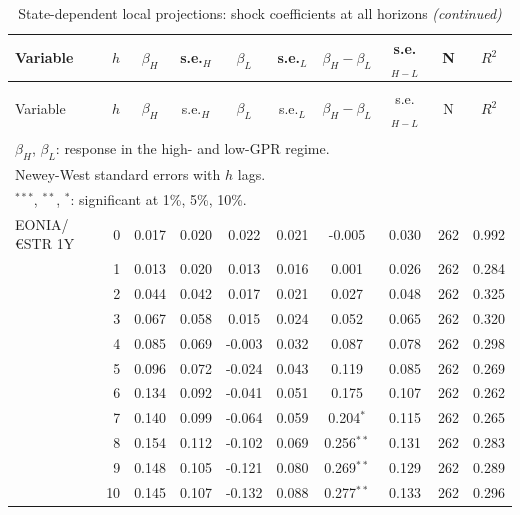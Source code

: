 \begingroup\fontsize{8}{10}\selectfont

\begin{longtable}[t]{lrcccccccc}
\caption{\label{tab:stlp_all_horizons}State-dependent local projections: shock coefficients at all horizons}\\
\toprule
Variable & $h$ & $\beta_H$ & s.e.$_H$ & $\beta_L$ & s.e.$_L$ & $\beta_H-\beta_L$ & s.e.$_{H-L}$ & N & $R^2$\\
\midrule
\endfirsthead
\caption[]{State-dependent local projections: shock coefficients at all horizons \textit{(continued)}}\\
\toprule
Variable & $h$ & $\beta_H$ & s.e.$_H$ & $\beta_L$ & s.e.$_L$ & $\beta_H-\beta_L$ & s.e.$_{H-L}$ & N & $R^2$\\
\midrule
\endhead

\endfoot
\bottomrule
\multicolumn{10}{l}{\rule{0pt}{1em}\textit{Notes:}}\\
\multicolumn{10}{l}{\rule{0pt}{1em}$\beta_H$, $\beta_L$: response in the high- and low-GPR regime.}\\
\multicolumn{10}{l}{\rule{0pt}{1em}Newey-West standard errors with $h$ lags.}\\
\multicolumn{10}{l}{\rule{0pt}{1em}$^{***}$, $^{**}$, $^{*}$: significant at 1\%, 5\%, 10\%.}\\
\endlastfoot
EONIA/€STR 1Y & 0 & 0.017 & 0.020 & 0.022 & 0.021 & -0.005 & 0.030 & 262 & 0.992\\
 & 1 & 0.013 & 0.020 & 0.013 & 0.016 & 0.001 & 0.026 & 262 & 0.284\\
 & 2 & 0.044 & 0.042 & 0.017 & 0.021 & 0.027 & 0.048 & 262 & 0.325\\
 & 3 & 0.067 & 0.058 & 0.015 & 0.024 & 0.052 & 0.065 & 262 & 0.320\\
 & 4 & 0.085 & 0.069 & -0.003 & 0.032 & 0.087 & 0.078 & 262 & 0.298\\
 & 5 & 0.096 & 0.072 & -0.024 & 0.043 & 0.119 & 0.085 & 262 & 0.269\\
 & 6 & 0.134 & 0.092 & -0.041 & 0.051 & 0.175 & 0.107 & 262 & 0.262\\
 & 7 & 0.140 & 0.099 & -0.064 & 0.059 & 0.204$^{*}$ & 0.115 & 262 & 0.265\\
 & 8 & 0.154 & 0.112 & -0.102 & 0.069 & 0.256$^{**}$ & 0.131 & 262 & 0.283\\
 & 9 & 0.148 & 0.105 & -0.121 & 0.080 & 0.269$^{**}$ & 0.129 & 262 & 0.289\\
 & 10 & 0.145 & 0.107 & -0.132 & 0.088 & 0.277$^{**}$ & 0.133 & 262 & 0.296\\

\end{longtable}
